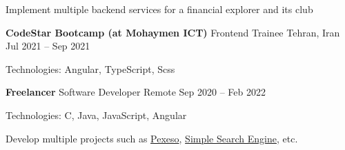 \documentclass[]{awesome-cv}
\begin{document}
\begin{cventries}
{\begin{cvitems}
		\vspace{1mm}
		\item {Implement multiple backend services for a financial explorer and its club}
	\end{cvitems}}
	\cventry
	{\textbf{CodeStar Bootcamp (at Mohaymen ICT)}}
	{Frontend Trainee}
	{Tehran, Iran}
	{Jul 2021 – Sep 2021}
	{\begin{cvitems}
		\vspace{1mm}
		\item {Technologies: Angular, TypeScript, Scss}
	\end{cvitems}}
	\cventry
	{\textbf{Freelancer}}
	{Software Developer}
	{Remote}
	{Sep 2020 – Feb 2022}
	{\begin{cvitems}
		\vspace{1mm}
		\item {Technologies: C, Java, JavaScript, Angular}
		\vspace{1mm}
		\item {Develop multiple projects such as \href{https://github.com/AshkanShakiba/Pexeso}{\textcolor{awesome}{Pexeso}}, \href{https://github.com/AshkanShakiba/Joojle}{\textcolor{awesome}{Simple Search Engine}}, etc.}
	\end{cvitems}}
\end{cventries}
\vspace{28mm}
\end{document}
